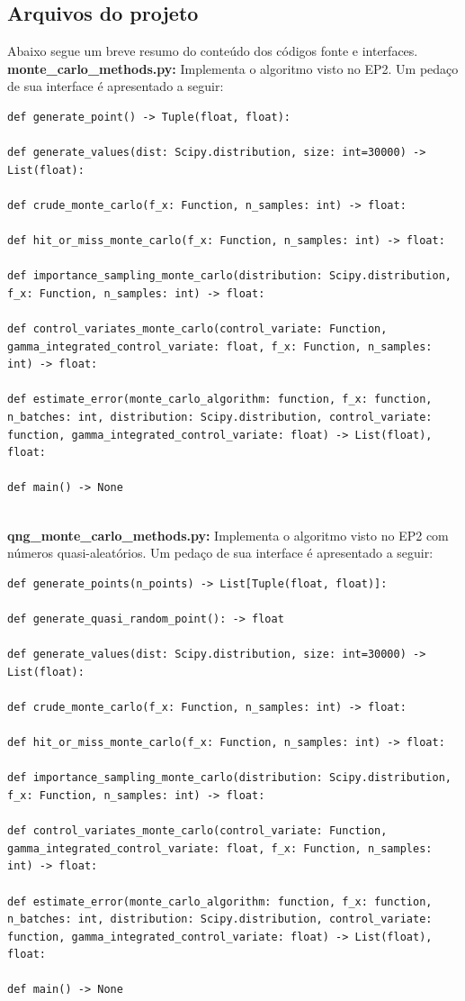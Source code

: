 \documentclass[twocolumn,amsmath,amssymb,floatfix]{revtex4}
\begin{document}
\subsection{Arquivos do projeto}
Abaixo segue um breve resumo do conteúdo dos códigos fonte e interfaces.
\\\indent \textbf{monte\_carlo\_methods.py:} Implementa o algoritmo visto no EP2. Um pedaço de sua interface é apresentado a seguir:
\begin{lstlisting}
def generate_point() -> Tuple(float, float):

def generate_values(dist: Scipy.distribution, size: int=30000) -> List(float):

def crude_monte_carlo(f_x: Function, n_samples: int) -> float:

def hit_or_miss_monte_carlo(f_x: Function, n_samples: int) -> float:

def importance_sampling_monte_carlo(distribution: Scipy.distribution, f_x: Function, n_samples: int) -> float:

def control_variates_monte_carlo(control_variate: Function, gamma_integrated_control_variate: float, f_x: Function, n_samples: int) -> float:

def estimate_error(monte_carlo_algorithm: function, f_x: function, n_batches: int, distribution: Scipy.distribution, control_variate: function, gamma_integrated_control_variate: float) -> List(float), float:

def main() -> None
\end{lstlisting}
\\\indent \textbf{qng\_monte\_carlo\_methods.py:} Implementa o algoritmo visto no EP2 com números quasi-aleatórios. Um pedaço de sua interface é apresentado a seguir:
\begin{lstlisting}
def generate_points(n_points) -> List[Tuple(float, float)]:

def generate_quasi_random_point(): -> float

def generate_values(dist: Scipy.distribution, size: int=30000) -> List(float):

def crude_monte_carlo(f_x: Function, n_samples: int) -> float:

def hit_or_miss_monte_carlo(f_x: Function, n_samples: int) -> float:

def importance_sampling_monte_carlo(distribution: Scipy.distribution, f_x: Function, n_samples: int) -> float:

def control_variates_monte_carlo(control_variate: Function, gamma_integrated_control_variate: float, f_x: Function, n_samples: int) -> float:

def estimate_error(monte_carlo_algorithm: function, f_x: function, n_batches: int, distribution: Scipy.distribution, control_variate: function, gamma_integrated_control_variate: float) -> List(float), float:

def main() -> None
\end{lstlisting}
\end{document}
